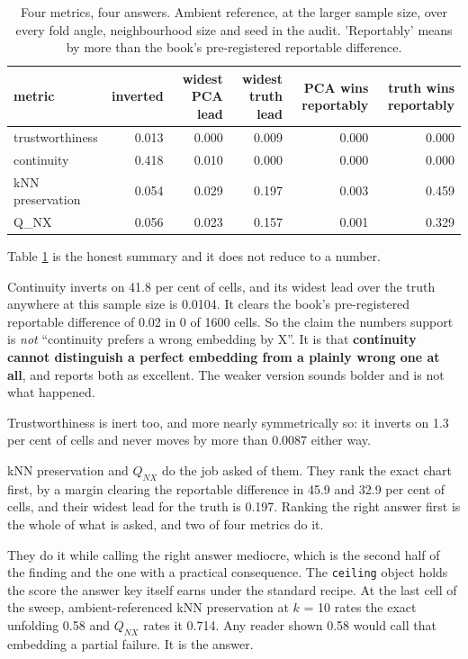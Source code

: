\documentclass[
  british,
  a4paper,
]{book}
\begin{document}
\begin{table}

\caption{\label{tab:eval-optimism}Four metrics, four answers. Ambient reference, at the larger sample size, over every fold angle, neighbourhood size and seed in the audit. 'Reportably' means by more than the book's pre-registered reportable difference.}
\centering
\begin{tabular}[t]{l|r|r|r|r|r}
\hline
metric & inverted & widest PCA lead & widest truth lead & PCA wins reportably & truth wins reportably\\
\hline
trustworthiness & 0.013 & 0.000 & 0.009 & 0.000 & 0.000\\
\hline
continuity & 0.418 & 0.010 & 0.000 & 0.000 & 0.000\\
\hline
kNN preservation & 0.054 & 0.029 & 0.197 & 0.003 & 0.459\\
\hline
Q\_NX & 0.056 & 0.023 & 0.157 & 0.001 & 0.329\\
\hline
\end{tabular}
\end{table}

Table \ref{tab:eval-optimism} is the honest summary and it does not reduce to a
number.

Continuity inverts on
41.8 per cent
of cells, and its widest lead over the truth anywhere at this sample size is
0.0104. It clears the
book's pre-registered reportable difference of 0.02 in
0 of 1600 cells. So the claim
the numbers support is \emph{not} ``continuity prefers a wrong embedding by X''. It is
that \textbf{continuity cannot distinguish a perfect embedding from a plainly wrong
one at all}, and reports both as excellent. The weaker version sounds bolder
and is not what happened.

Trustworthiness is inert too, and more nearly symmetrically so: it inverts on
1.3
per cent of cells and never moves by more than
0.0087
either way.

kNN preservation and \(Q_{NX}\) do the job asked of them. They rank the exact
chart first, by a margin clearing the reportable difference in
45.9
and
32.9
per cent of cells, and their widest lead for the truth is
0.197.
Ranking the right answer first is the whole of what is asked, and two of four
metrics do it.

They do it while calling the right answer mediocre, which is the second half of
the finding and the one with a practical consequence. The \texttt{ceiling} object holds
the score the answer key itself earns under the standard recipe. At the last
cell of the sweep, ambient-referenced kNN preservation at \(k\) = 10
rates the exact unfolding 0.58 and \(Q_{NX}\) rates it
0.714. Any reader shown
0.58 would call that embedding a partial failure. It
is the answer.
\end{document}
